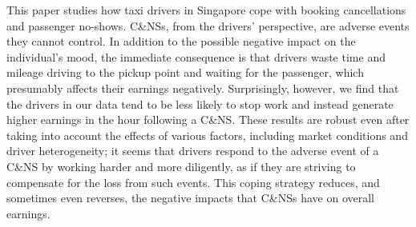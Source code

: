 \documentclass[reviewmode]{AEA}
\begin{document}
This paper studies how taxi drivers in Singapore cope with booking cancellations and passenger no-shows. C\&NSs, from the drivers' perspective, are adverse events they cannot control. In addition to the possible negative impact on the individual's mood, the immediate consequence is that drivers waste time and mileage driving to the pickup point and waiting for the passenger, which presumably affects their earnings negatively. Surprisingly, however, we find that the drivers in our data tend to be less likely to stop work and instead generate higher earnings in the hour following a C\&NS. These results are robust even after taking into account the effects of various factors, including market conditions and driver heterogeneity; it seems that drivers respond to the adverse event of a C\&NS by  working harder and more diligently, as if they are striving to compensate for the loss from such events. This coping strategy reduces, and sometimes even reverses, the negative impacts that C\&NSs have on overall earnings.

\end{document}
